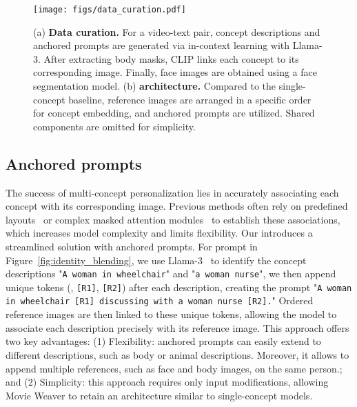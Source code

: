 \begin{figure*}[t]
    \centering
    \vspace{-2em}
    \texttt{[image: figs/data\_curation.pdf]}
    \vspace{-0.5em}
    \caption{(a) \textbf{Data curation.} For a video-text pair,  concept descriptions and anchored prompts are generated via in-context learning with Llama-3. After  extracting body masks,  CLIP links each concept to its corresponding image.  Finally, face images are obtained using a face segmentation model. (b) \textbf{\workname architecture.} Compared to the single-concept baseline, reference images are arranged in a specific order for concept embedding, and anchored prompts are utilized. Shared components are omitted for simplicity.}
    \label{fig:data_curation}
    \vspace{-1em}
\end{figure*}


\subsection{Anchored prompts}

The success of multi-concept personalization lies in accurately associating each concept with its corresponding image. 
Previous methods often rely on predefined layouts~\cite{liu2023cones,gu2024mix} or complex masked attention modules~\cite{xiao2024fastcomposer,kim2024instantfamily,he2024uniportrait,ostashev2024moa} to establish these associations, which increases model complexity and limits flexibility.
Our \workname introduces a streamlined solution with anchored prompts.
For prompt in Figure~\ref{fig:identity_blending}, we use Llama-3~\cite{dubey2024llama} to identify the concept descriptions "\texttt{A woman in wheelchair}" and "\texttt{a woman nurse}", we then append unique tokens (\eg, \texttt{[R1]}, \texttt{[R2]}) after each description, creating the prompt "\texttt{A woman in wheelchair [R1] discussing with a woman nurse [R2].}"
Ordered reference images are then linked to these unique tokens, allowing the model to associate each description precisely with its reference image.
This approach offers two key advantages: (1) Flexibility: anchored prompts can easily extend to different descriptions, such as body or animal descriptions. Moreover, it allows to append multiple references, such as face and body images, on the same person.; and (2) Simplicity: this approach requires only input modifications, allowing Movie Weaver to retain an architecture similar to single-concept models.

